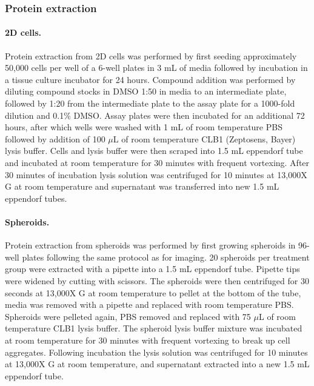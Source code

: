\documentclass[a4paper,11pt,twoside,openright]{scrbook}
\begin{document}
\subsubsection{Protein extraction}

\paragraph{2D cells.}
Protein extraction from 2D cells was performed by first seeding approximately 50,000 cells per well of a 6-well plates in 3 mL of media followed by incubation in a tissue culture incubator for 24 hours.
Compound addition was performed by diluting compound stocks in DMSO 1:50 in media to an intermediate plate, followed by 1:20 from the intermediate plate to the assay plate for a 1000-fold dilution and 0.1\% DMSO.
Assay plates were then incubated for an additional 72 hours, after which wells were washed with 1 mL of room temperature PBS followed by addition of 100 $\mu$L of room temperature CLB1 (Zeptosens, Bayer) lysis buffer.
Cells and lysis buffer were then scraped into 1.5 mL eppendorf tube and incubated at room temperature for 30 minutes with frequent vortexing.
After 30 minutes of incubation lysis solution was centrifuged for 10 minutes at 13,000X G at room temperature and supernatant was transferred into new 1.5 mL eppendorf tubes.

\paragraph{Spheroids.}
Protein extraction from spheroids was performed by first growing spheroids in 96-well plates following the same protocol as for imaging.
20 spheroids per treatment group were extracted with a pipette into a 1.5 mL eppendorf tube.
Pipette tips were widened by cutting with scissors.
The spheroids were then centrifuged for 30 seconds at 13,000X G at room temperature to pellet at the bottom of the tube, media was removed with a pipette and replaced with room temperature PBS.
Spheroids were pelleted again, PBS removed and replaced with 75 $\mu$L of room temperature CLB1 lysis buffer.
The spheroid lysis buffer mixture was incubated at room temperature for 30 minutes with frequent vortexing to break up cell aggregates.
Following incubation the lysis solution was centrifuged for 10 minutes at 13,000X G at room temperature, and supernatant extracted into a new 1.5 mL eppendorf tube.
\end{document}
